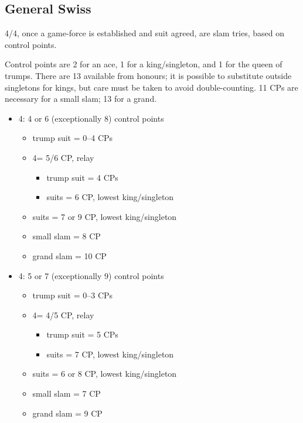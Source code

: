 \documentclass[a4paper,14pt]{extarticle}
\begin{document}
\subsection{General Swiss}
\label{sec:swiss}
\label{note:19}

4\clubs/4\diamonds, once a game-force is established and suit agreed, are slam tries, based
on control points.

Control points are 2 for an ace, 1 for a king/singleton, and 1 for the queen of
trumps.  There are 13 available from honours; it is possible to substitute
outside singletons for kings, but care must be taken to avoid double-counting.
11 CPs are necessary for a small slam; 13 for a grand.

\begin{itemize}
\item 4\clubs: 4 or 6 (exceptionally 8) control points
	\begin{itemize}
   \item trump suit = 0--4 CPs
   \item 4\diamonds = 5/6 CP, relay
		\begin{itemize}
      \item trump suit = 4 CPs
      \item suits = 6 CP, lowest king/singleton
		\end{itemize}
   \item suits = 7 or 9 CP, lowest king/singleton
   \item small slam = 8 CP
   \item grand slam = 10 CP
	\end{itemize}

\item 4\diamonds: 5 or 7 (exceptionally 9) control points
	\begin{itemize}
   \item trump suit = 0--3 CPs
   \item 4\hearts = 4/5 CP, relay
		\begin{itemize}
      \item trump suit = 5 CPs
      \item suits = 7 CP, lowest king/singleton
		\end{itemize}
   \item suits = 6 or 8 CP, lowest king/singleton
   \item small slam = 7 CP
   \item grand slam = 9 CP
	\end{itemize}
\end{itemize}
\end{document}
